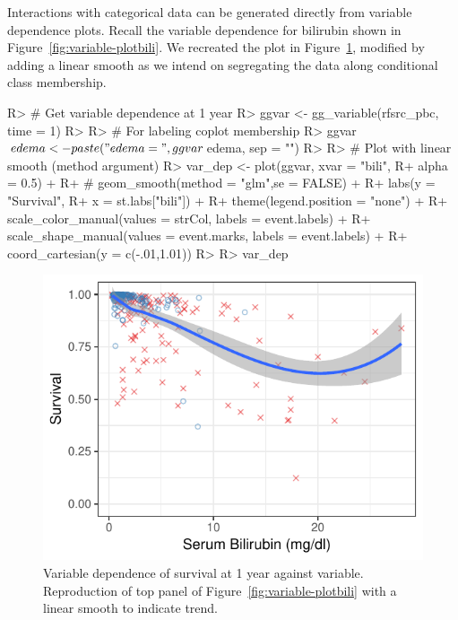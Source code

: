 \documentclass[article]{jss}
\begin{document}
Interactions with categorical data can be generated directly from variable dependence plots. Recall the variable dependence for bilirubin shown in Figure~\ref{fig:variable-plotbili}. We recreated the  plot in  Figure~\ref{fig:var_dep}, modified by adding a linear smooth as we intend on segregating the data along conditional class membership.
\begin{Schunk}
\begin{Sinput}
R> # Get variable dependence at 1 year
R> ggvar <- gg_variable(rfsrc_pbc, time = 1)
R> 
R> # For labeling coplot membership
R> ggvar$edema <- paste("edema = ", ggvar$edema, sep = "")
R> 
R> # Plot with linear smooth (method argument)
R> var_dep <- plot(ggvar, xvar = "bili",
R+                 alpha = 0.5) +
R+ #  geom_smooth(method = "glm",se = FALSE) +
R+   labs(y = "Survival",
R+        x = st.labs["bili"]) +
R+   theme(legend.position = "none") +
R+   scale_color_manual(values = strCol, labels = event.labels) +
R+   scale_shape_manual(values = event.marks, labels = event.labels) +
R+   coord_cartesian(y = c(-.01,1.01))
R> 
R> var_dep
\end{Sinput}
\begin{figure}[!htb]

{\centering \includegraphics{fig-rfs/rfs-var_dep-1} 

}

\caption{Variable dependence of survival at 1 year against  variable. Reproduction of top panel of Figure~\ref{fig:variable-plotbili} with a linear smooth to indicate trend.}\label{fig:var_dep}
\end{figure}
\end{Schunk}
\end{document}
